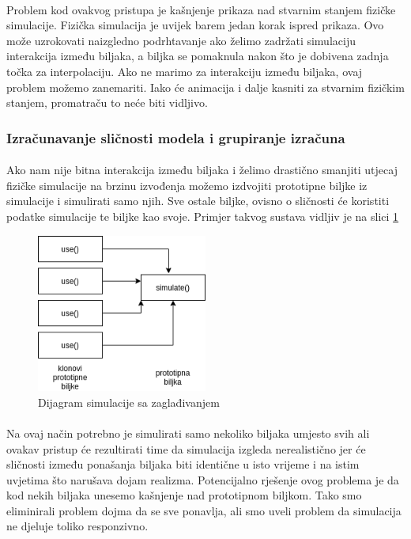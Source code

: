 \documentclass[times, utf8, diplomski]{fer}
\begin{document}
\paragraph{}
Problem kod ovakvog pristupa je kašnjenje prikaza nad stvarnim stanjem fizičke 
simulacije. Fizička simulacija je uvijek barem jedan korak ispred prikaza. Ovo 
može uzrokovati naizgledno podrhtavanje ako želimo zadržati simulaciju 
interakcija između biljaka, a biljka se pomaknula nakon što je dobivena zadnja 
točka za interpolaciju. Ako ne marimo za interakciju između biljaka, ovaj 
problem možemo zanemariti. Iako će animacija i dalje kasniti za stvarnim 
fizičkim stanjem, promatraču to neće biti vidljivo.
\subsubsection{Izračunavanje sličnosti modela i grupiranje izračuna}
\paragraph{}
Ako nam nije bitna interakcija između biljaka i želimo drastično smanjiti utjecaj 
fizičke simulacije na brzinu izvođenja možemo izdvojiti prototipne biljke iz simulacije i 
simulirati samo njih. Sve ostale biljke, ovisno o sličnosti će koristiti podatke simulacije 
te biljke kao svoje. Primjer takvog sustava vidljiv je na slici \ref{fig:531-3}
\begin{figure}[h]
	\centering
	\includegraphics[width=0.5\textwidth]{img/531-3}
	\caption{Dijagram simulacije sa zaglađivanjem}
	\label{fig:531-3}
\end{figure}
\paragraph{}
Na ovaj način potrebno je simulirati samo nekoliko biljaka umjesto svih ali ovakav pristup 
će rezultirati time da simulacija izgleda nerealistično jer će sličnosti između ponašanja 
biljaka biti identične u isto vrijeme i na istim uvjetima što narušava dojam realizma. 
Potencijalno rješenje ovog problema je da kod nekih biljaka unesemo kašnjenje nad 
prototipnom biljkom. Tako smo eliminirali problem dojma da se sve ponavlja, ali smo 
uveli problem da simulacija ne djeluje toliko responzivno.
\end{document}
